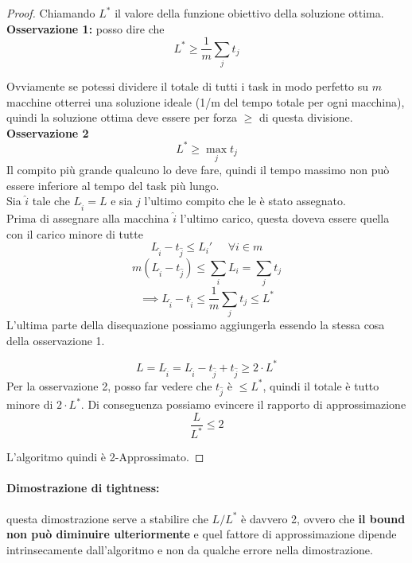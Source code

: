\documentclass[11pt]{article}
\begin{document}
	\begin{proof}
		Chiamando $L^\ast$ il valore della funzione obiettivo della soluzione ottima. \\
		
		\textbf{Osservazione 1:} posso dire che 
		$$ L^\ast \geq \frac{1}{m} \sum_{j} t_j $$
		
		Ovviamente se potessi dividere il totale di tutti i task in modo perfetto su $m$ macchine otterrei una soluzione ideale (1/m del tempo totale per ogni macchina), quindi la soluzione ottima deve essere per forza $\geq$ di questa divisione.\\
		
		\textbf{Osservazione 2 }
		$$ L^\ast \geq \max_j t_j $$
		Il compito più grande qualcuno lo deve fare, quindi il tempo massimo non può essere inferiore al tempo del task più lungo.\\
		
		Sia $\hat{i}$ tale che $L_{\hat{i}} = L$ e sia $\hat{j}$ l'ultimo compito che le è stato assegnato.\\
		
		Prima di assegnare alla macchina $\hat{i}$ l'ultimo carico, questa doveva essere quella con il carico minore di tutte
		$$ L_{\hat{i}} - t_{\hat{j}} \leq L_i ' \;\;\;\;\; \forall i \in m $$
		$$ m (L_{\hat{i}} - t_{\hat{j}}) \leq \sum_i L_i = \sum_j t_j $$
		$$ \implies L_{\hat{i}} - t_{\hat{i}} \leq \frac{1}{m} \sum_j t_j \leq L^\ast $$
		L'ultima parte della disequazione possiamo aggiungerla essendo la stessa cosa della osservazione 1.
		
		$$ L = L_{\hat{i}} = L_{\hat{i}} - t_{\hat{j}} + t_{\hat{j}} \geq 2 \cdot L^\ast $$
		Per la osservazione 2, posso far vedere che $t_{\hat{j}}$ è $\leq L^\ast$, quindi il totale è tutto minore di $2 \cdot L^\ast$. Di conseguenza possiamo evincere il rapporto di approssimazione
		$$ \frac{L}{L^\ast} \leq 2 $$
		
		L'algoritmo quindi è 2-Approssimato.
	\end{proof}
	
	\newpage
	
	
	\paragraph{Dimostrazione di tightness:} questa dimostrazione serve a stabilire che $L/L^\ast$ è davvero 2, ovvero che \textbf{il bound non può diminuire ulteriormente} e quel fattore di approssimazione dipende intrinsecamente dall'algoritmo e non da qualche errore nella dimostrazione.\\
	
\end{document}
